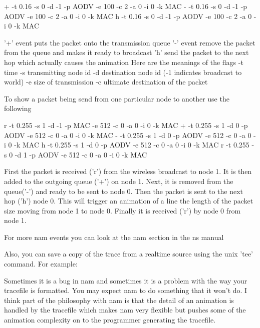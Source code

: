 \begin{program}
+ -t 0.16 -s 0 -d -1 -p AODV -e 100 -c 2 -a 0 -i 0 -k MAC
- -t 0.16 -s 0 -d -1 -p AODV -e 100 -c 2 -a 0 -i 0 -k MAC
h -t 0.16 -s 0 -d -1 -p AODV -e 100 -c 2 -a 0 -i 0 -k MAC
\end{program}

'+' event puts the packet onto the transmission queue
'-' event remove the packet from the queue and makes it ready to
broadcast
'h' send the packet to the next hop which actually causes the animation
Here are the meanings of the flags
  -t time
  -s transmitting node id
  -d destination node id (-1 indicates broadcast to world)
  -e size of transmission
  -c ultimate destination of the packet

To show a packet being send from one particular node to another use the
following

\begin{program}
r -t 0.255 -s 1 -d -1 -p MAC -e 512 -c 0 -a 0 -i 0 -k MAC
+ -t 0.255 -s 1 -d 0 -p AODV -e 512 -c 0 -a 0 -i 0 -k MAC
- -t 0.255 -s 1 -d 0 -p AODV -e 512 -c 0 -a 0 -i 0 -k MAC
h -t 0.255 -s 1 -d 0 -p AODV -e 512 -c 0 -a 0 -i 0 -k MAC
r -t 0.255 -s 0 -d 1 -p AODV -e 512 -c 0 -a 0 -i 0 -k MAC
\end{program}

First the packet is received ('r') from the wireless broadcast to node
1.  It is then added to the outgoing queue ('+') on node 1.  Next, it is
removed from the queue('-') and ready to be sent to node 0.  Then the
packet is sent to the next hop ('h') node 0.  This will trigger an
animation of a line the length of the packet size moving from node 1 to
node 0.  Finally it is received ('r') by node 0 from node 1.

For more nam events you can look at the nam section in the ns manual

Also, you can save a copy of the trace from a realtime
source using the unix 'tee' command. For example:

\begin{program}
\end{program}

Sometimes it is a bug in nam and sometimes it is a problem with the way
your tracefile is formatted.  You may expect nam to do something that it
won't do.  I think part of the philosophy with nam is that the detail of
an animation is handled by the tracefile which makes nam very flexible
but pushes some of the animation complexity on to the programmer
generating the tracefile. 

